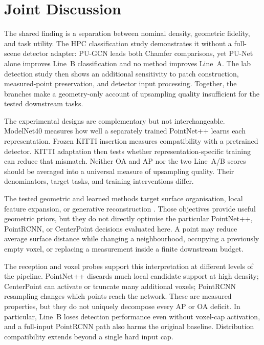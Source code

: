\FloatBarrier
\section{Joint Discussion}
\label{sec:discussion}

The shared finding is a separation between nominal density, geometric
fidelity, and task utility. The HPC classification study demonstrates it
without a full-scene detector adapter: PU-GCN leads both Chamfer comparisons,
yet PU-Net alone improves Line~B classification and no method improves
Line~A. The lab detection study then shows an additional sensitivity to
patch construction, measured-point preservation, and detector input processing.
Together, the branches make a geometry-only account of upsampling quality
insufficient for the tested downstream tasks.

The experimental designs are complementary but not interchangeable.
ModelNet40 measures how well a separately trained PointNet++ learns each
representation. Frozen KITTI insertion measures compatibility with a
pretrained detector. KITTI adaptation then tests whether representation-specific
training can reduce that mismatch. Neither OA and AP nor the two Line~A/B
scores should be averaged into a universal measure of upsampling quality.
Their denominators, target tasks, and training interventions differ.

The tested geometric and learned methods target surface organisation,
local feature expansion, or generative reconstruction
\cite{huang2013ear,yu2018punet,qian2021pugcn,kim2023puedgeformer,zhang2025pdans}.
Those objectives provide useful geometric priors, but they do not directly
optimise the particular PointNet++, PointRCNN, or CenterPoint decisions
evaluated here. A point may reduce average surface distance while changing
a neighbourhood, occupying a previously empty voxel, or replacing a
measurement inside a finite downstream budget.

The reception and voxel probes support this interpretation at different
levels of the pipeline. PointNet++ discards much local candidate support
at high density; CenterPoint can activate or truncate many additional
voxels; PointRCNN resampling changes which points reach the network.
These are measured properties, but they do not uniquely decompose every
AP or OA deficit. In particular, Line~B loses detection performance even
without voxel-cap activation, and a full-input PointRCNN path also harms
the original baseline. Distribution compatibility extends beyond a single
hard input cap.

